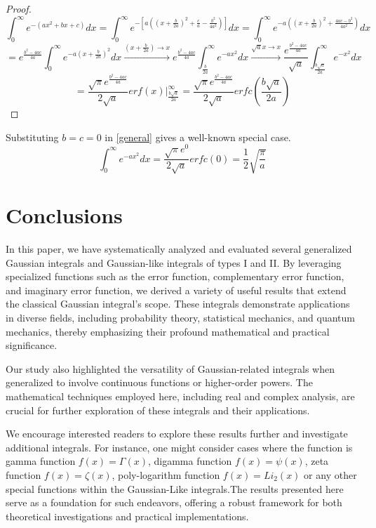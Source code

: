 \documentclass[a4paper,twoside,10pt]{article}
\begin{document}
 \begin{proof}
  \[ \int_0^{\infty} e^{-(ax^2+bx+c)} dx = \int_0^{\infty} e^{-[a((x+\frac{b}{2a})^2+ \frac{c}{a}- \frac{b^2}{4a^2})]} dx = \int_0^{\infty} e^{-a((x+\frac{b}{2a})^2+ \frac{4ac-b^2}{4a^2})} dx \]
  \[  = e^{\frac{b^2-4ac}{4a}}\int_0^{\infty} e^{-a(x+\frac{b}{2a})^2} dx \xrightarrow{(x+\frac{b}{2a})\rightarrow x}  e^{\frac{b^2-4ac}{4a}}\int_{\frac{b}{2a}}^{\infty} e^{-ax^2} dx \xrightarrow{\sqrt{a}x\rightarrow x} \frac{e^{\frac{b^2-4ac}{4a}}}{\sqrt{a}}\int_{\frac{b\sqrt{a}}{2a}}^{\infty} e^{-x^2} dx     \]
  \[ = \frac{ \sqrt{\pi}e^{\frac{b^2-4ac}{4a}}}{2\sqrt{a}} erf(x)\Big|_{\frac{b\sqrt{a}}{2a}}^{\infty}  =  \frac{\sqrt{\pi}e^{\frac{b^2-4ac}{4a}}}{2\sqrt{a}} erfc({\frac{b\sqrt{a}}{2a}})   \]
  \end{proof}
  Substituting $b = c = 0$ in \eqref{general} gives a well-known special case. \\
  \begin{equation}\label{specialgeneral}
   \int_0^{\infty} e^{-ax^2} dx = \frac{\sqrt{\pi}e^0}{2\sqrt{a}} erfc(0) = \frac{1}{2} \sqrt{\frac{\pi}{a}} 
  \end{equation}

\section{Conclusions} In this paper, we have systematically analyzed and evaluated several generalized Gaussian integrals and Gaussian-like integrals of types I and II. By leveraging specialized functions such as the error function, complementary error function, and imaginary error function, we derived a variety of useful results that extend the classical Gaussian integral's scope. These integrals demonstrate applications in diverse fields, including probability theory, statistical mechanics, and quantum mechanics, thereby emphasizing their profound mathematical and practical significance.

Our study also highlighted the versatility of Gaussian-related integrals when generalized to involve continuous functions or higher-order powers. The mathematical techniques employed here, including real and complex analysis, are crucial for further exploration of these integrals and their applications.


We encourage interested readers to explore these results further and investigate additional integrals. For instance, one might consider cases where the function is gamma function $f(x) =  \Gamma(x)$, digamma function $f(x) = \psi(x)$, zeta function $f(x) = \zeta(x)$, poly-logarithm function $f(x) = Li_2(x) $ or any other special functions within the Gaussian-Like integrals.The results presented here serve as a foundation for such endeavors, offering a robust framework for both theoretical investigations and practical implementations. 
\end{document}

